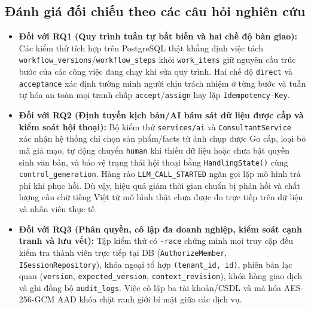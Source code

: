 \subsection{Đánh giá đối chiếu theo các câu hỏi nghiên cứu}
\begin{itemize}
  \item \textbf{Đối với RQ1 (Quy trình tuần tự bất biến và hai chế độ bàn giao):} Các kiểm thử tích hợp trên PostgreSQL thật khẳng định việc tách
    \texttt{workflow\_\hspace{0pt}versions}/\hspace{0pt}\texttt{workflow\_\hspace{0pt}steps} khỏi \texttt{work\_\hspace{0pt}items} giữ nguyên cấu trúc bước của các công việc đang chạy khi sửa quy trình.
  Hai chế độ \texttt{direct} và \texttt{acceptance} xác định tường minh người chịu trách nhiệm ở từng bước và tuần tự hóa an toàn mọi tranh chấp
  \texttt{accept}/\texttt{assign} hay lặp \texttt{Idempotency-\hspace{0pt}Key}.
  \item \textbf{Đối với RQ2 (Định tuyến kịch bản/AI bám sát dữ liệu được cấp và kiểm soát hội thoại):} Bộ kiểm thử \texttt{services/ai} và \texttt{ConsultantService} xác nhận
    hệ thống chỉ chọn sản phẩm/facts từ ảnh chụp được Go cấp, loại bỏ mã giả mạo, tự động chuyển \texttt{human} khi thiếu dữ liệu hoặc chưa bật quyền sinh văn bản, và bảo vệ
    trạng thái hội thoại bằng \texttt{HandlingState()} cùng \texttt{control\_\hspace{0pt}generation}.
  Hàng rào \texttt{LLM\_\hspace{0pt}CALL\_\hspace{0pt}STARTED} ngăn gọi lặp mô hình trả phí khi phục hồi. Dù vậy, hiệu quả giảm thời gian chuẩn bị phản hồi và chất lượng câu chữ tiếng Việt từ mô hình
  thật chưa được đo trực tiếp trên dữ liệu và nhân viên thực tế.
  \item \textbf{Đối với RQ3 (Phân quyền, cô lập đa doanh nghiệp, kiểm soát cạnh tranh và lưu vết):} Tập kiểm thử có \texttt{-race} chứng minh mọi truy cập đều kiểm tra thành
    viên trực tiếp tại DB (\texttt{AuthorizeMember}, \texttt{ISessionRepository}), khóa ngoại tổ hợp \texttt{(tenant\_\hspace{0pt}id, id)}, phiên bản lạc quan (\texttt{version},
    \texttt{expected\_\hspace{0pt}version}, \texttt{context\_\hspace{0pt}revision}), khóa hàng giao dịch và ghi đồng bộ \texttt{audit\_\hspace{0pt}logs}.
  Việc cô lập ba tài khoản/CSDL và mã hóa AES-256-GCM AAD khóa chặt ranh giới bí mật giữa các dịch vụ.
\end{itemize}

